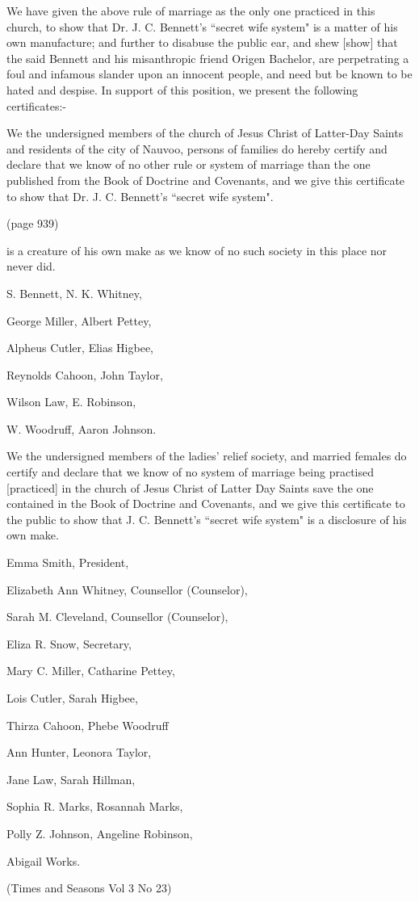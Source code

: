 We have given the above rule of marriage as the only one practiced in this church, to
show that Dr. J. C. Bennett's ``secret wife system" is a matter of his own
manufacture; and further to disabuse the public ear, and shew [show] that the said
Bennett and his misanthropic friend Origen Bachelor, are perpetrating a foul and
infamous slander upon an innocent people, and need but be known to be hated and
despise. In support of this position, we present the following certificates:-

We the undersigned members of the church of Jesus Christ of Latter-Day Saints and
residents of the city of Nauvoo, persons of families do hereby certify and declare
that we know of no other rule or system of marriage than the one published from the
Book of Doctrine and Covenants, and we give this certificate to show that Dr. J. C.
Bennett's ``secret wife system".

(page 939)

is a creature of his own make as we know of no such society in this place nor never 
did.

S. Bennett, N. K. Whitney,

George Miller, Albert Pettey,

Alpheus Cutler, Elias Higbee,

Reynolds Cahoon, John Taylor,

Wilson Law, E. Robinson,

W. Woodruff, Aaron Johnson.

We the undersigned members of the ladies' relief society, and married females do
certify and declare that we know of no system of marriage being practised [practiced]
in the church of Jesus Christ of Latter Day Saints save the one contained in the Book
of Doctrine and Covenants, and we give this certificate to the public to show that J.
C. Bennett's ``secret wife system" is a disclosure of his own make.

Emma Smith, President,

Elizabeth Ann Whitney, Counsellor (Counselor),

Sarah M. Cleveland, Counsellor (Counselor),

Eliza R. Snow, Secretary,

Mary C. Miller, Catharine Pettey,

Lois Cutler, Sarah Higbee,

Thirza Cahoon, Phebe Woodruff

Ann Hunter, Leonora Taylor,

Jane Law, Sarah Hillman,

Sophia R. Marks, Rosannah Marks,

Polly Z. Johnson, Angeline Robinson,

Abigail Works.

(Times and Seasons Vol 3 No 23)